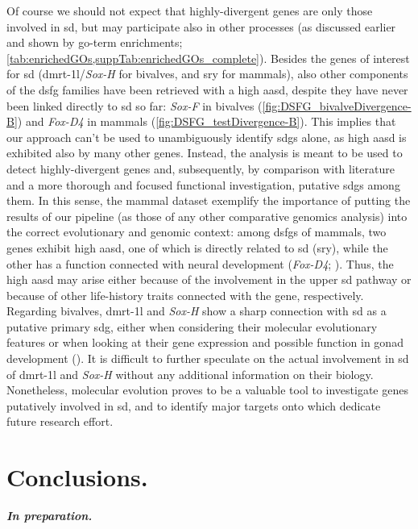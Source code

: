 Of course we should not expect that highly-divergent genes are only those involved in \gls{sd}, but may participate also in other processes (as discussed earlier and shown by \gls{go}-term enrichments; \cref{tab:enrichedGOs,suppTab:enrichedGOs_complete}). Besides the genes of interest for \gls{sd} (\gls{dmrt-1l}/\textit{Sox-H} for bivalves, and \gls{sry} for mammals), also other components of the \gls{dsfg} families have been retrieved with a high \gls{aasd}, despite they have never been linked directly to \gls{sd} so far: \textit{Sox-F} in bivalves (\cref{fig:DSFG_bivalveDivergence-B}) and \textit{Fox-D4} in mammals (\cref{fig:DSFG_testDivergence-B}). This implies that our approach can't be used to unambiguously identify \glspl{sdg} alone, as high \gls{aasd} is exhibited also by many other genes. Instead, the analysis is meant to be used to detect highly-divergent genes and, subsequently, by comparison with literature and a more thorough and focused functional investigation, putative \glspl{sdg} among them. In this sense, the mammal dataset exemplify the importance of putting the results of our pipeline (as those of any other comparative genomics analysis) into the correct evolutionary and genomic context: among \glspl{dsfg} of mammals, two genes exhibit high \gls{aasd}, one of which is directly related to \gls{sd} (\gls{sry}), while the other has a function connected with neural development (\textit{Fox-D4}; \textbf{\cite{klein2013conserved}}). Thus, the high \gls{aasd} may arise either because of the involvement in the upper \gls{sd} pathway or because of other life-history traits connected with the gene, respectively. Regarding bivalves, \gls{dmrt-1l} and \textit{Sox-H} show a sharp connection with \gls{sd} as a putative primary \gls{sdg}, either when considering their molecular evolutionary features or when looking at their gene expression and possible function in gonad development (\textbf{\cite{naimi2009molecular, teaniniuraitemoana2014gonad, zhang2014genomic, capt2018deciphering, li2018foxl2, afonso2019gonad, liang2019sox2, yue2021variance}}). It is difficult to further speculate on the actual involvement in \gls{sd} of \gls{dmrt-1l} and \textit{Sox-H} without any additional information on their biology. Nonetheless, molecular evolution proves to be a valuable tool to investigate genes putatively involved in \gls{sd}, and to identify major targets onto which dedicate future research effort.

\section{Conclusions.} \label{chapter3_conclusions}

\textbf{\textit{In preparation.}}

\clearpage


% 